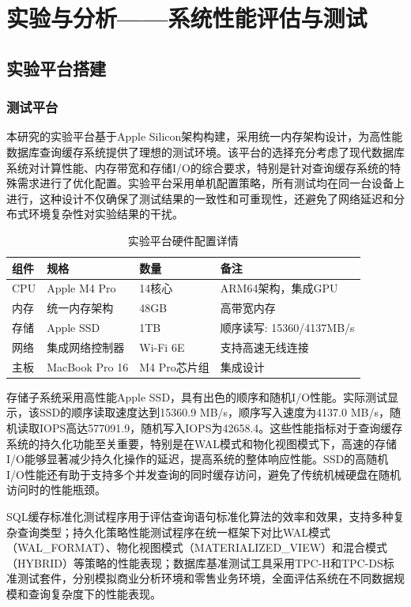 \chapter{实验与分析——系统性能评估与测试}

\section{实验平台搭建}

\subsection{测试平台}

本研究的实验平台基于Apple Silicon架构构建，采用统一内存架构设计，为高性能数据库查询缓存系统提供了理想的测试环境。该平台的选择充分考虑了现代数据库系统对计算性能、内存带宽和存储I/O的综合要求，特别是针对查询缓存系统的特殊需求进行了优化配置。实验平台采用单机配置策略，所有测试均在同一台设备上进行，这种设计不仅确保了测试结果的一致性和可重现性，还避免了网络延迟和分布式环境复杂性对实验结果的干扰。

\begin{table}[!htb]
    \caption{实验平台硬件配置详情}
    \label{table6_1}
    \centering
    \begin{tabular}{p{1cm}p{3cm}p{3cm}p{5cm}}
        \hline
        组件 & 规格 & 数量 & 备注 \\
        \hline
        CPU & Apple M4 Pro & 14核心 & ARM64架构，集成GPU \\
        内存 & 统一内存架构 & 48GB & 高带宽内存 \\
        存储 & Apple SSD & 1TB & 顺序读写: 15360/4137MB/s \\
        网络 & 集成网络控制器 & Wi-Fi 6E & 支持高速无线连接 \\
        主板 & MacBook Pro 16 & M4 Pro芯片组 & 集成设计 \\
        \hline
    \end{tabular}
\end{table}

存储子系统采用高性能Apple SSD，具有出色的顺序和随机I/O性能。实际测试显示，该SSD的顺序读取速度达到15360.9 MB/s，顺序写入速度为4137.0 MB/s，随机读取IOPS高达577091.9，随机写入IOPS为42658.4。这些性能指标对于查询缓存系统的持久化功能至关重要，特别是在WAL模式和物化视图模式下，高速的存储I/O能够显著减少持久化操作的延迟，提高系统的整体响应性能。SSD的高随机I/O性能还有助于支持多个并发查询的同时缓存访问，避免了传统机械硬盘在随机访问时的性能瓶颈。

SQL缓存标准化测试程序用于评估查询语句标准化算法的效率和效果，支持多种复杂查询类型；持久化策略性能测试程序在统一框架下对比WAL模式（WAL\_FORMAT）、物化视图模式（MATERIALIZED\_VIEW）和混合模式（HYBRID）等策略的性能表现；数据库基准测试工具采用TPC-H和TPC-DS标准测试套件，分别模拟商业分析环境和零售业务环境，全面评估系统在不同数据规模和查询复杂度下的性能表现。

